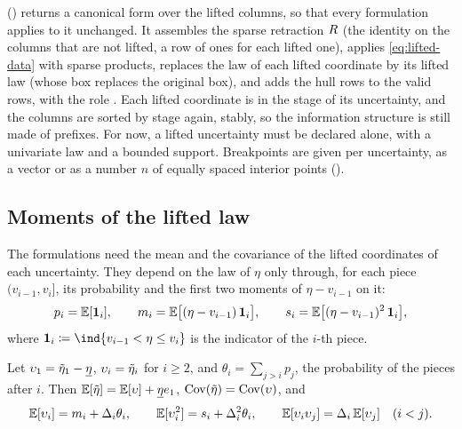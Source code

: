  () returns a canonical form over the lifted columns,
so that every formulation applies to it unchanged.
It assembles the sparse retraction $R$ (the identity on the columns that are not lifted, a row of ones for each lifted one),
applies \eqref{eq:lifted-data} with sparse products,
replaces the law of each lifted coordinate by its lifted law (whose box replaces the original box),
and adds the hull rows to the valid rows, with the role .
Each lifted coordinate is in the stage of its uncertainty, and the columns are sorted by stage again, stably,
so the information structure is still made of prefixes.
For now, a lifted uncertainty must be declared alone, with a univariate law and a bounded support.
Breakpoints are given per uncertainty, as a vector or as a number $n$ of equally spaced interior points ().

\subsection{Moments of the lifted law}
\label{sec:lifted-moments}

The formulations need the mean and the covariance of the lifted coordinates of each uncertainty.
They depend on the law of $\eta$ only through, for each piece $(v_{i-1}, v_i]$, its probability and the first two moments of $\eta - v_{i-1}$ on it:
\[
p_i = \mathbb{E}[\mathbf{1}_i],
\qquad
m_i = \mathbb{E}\bigl[(\eta - v_{i-1})\,\mathbf{1}_i\bigr],
\qquad
s_i = \mathbb{E}\bigl[(\eta - v_{i-1})^2\,\mathbf{1}_i\bigr],
\]
where $\one_i \defeq \ind{v_{i-1} < \eta \le v_i}$ is the indicator of the $i$-th piece.

\begin{proposition}
\label{prop:lifted-moments}
Let $\upsilon_1 = \tilde\eta_1 - \underline\eta$, $\upsilon_i = \tilde\eta_i$ for $i \ge 2$, and $\theta_i = \sum_{j > i} p_j$, the probability of the pieces after $i$.
Then $\mathbb{E}[\tilde\eta] = \mathbb{E}[\upsilon] + \underline\eta e_1$, $\operatorname{Cov}(\tilde\eta) = \operatorname{Cov}(\upsilon)$, and
\[
\mathbb{E}[\upsilon_i] = m_i + \Delta_i\theta_i, \qquad
\mathbb{E}[\upsilon_i^2] = s_i + \Delta_i^2\theta_i, \qquad
\mathbb{E}[\upsilon_i\upsilon_j] = \Delta_i\,\mathbb{E}[\upsilon_j] \quad (i < j).
\]
\end{proposition}

